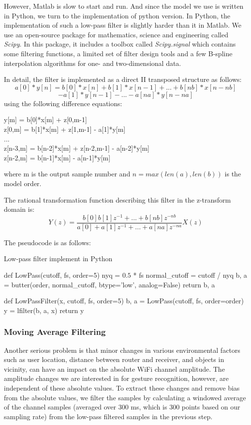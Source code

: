 \documentclass[conference]{IEEEtran}
\begin{document}
However, Matlab is slow to start and run. And since the model we use is written in Python, we turn to the implementation of python version. In Python, the implementation of such a low-pass filter is slightly harder than it in Matlab. We use an open-source package for mathematics, science and engineering called \emph{Scipy}. In this package, it includes a toolbox called \emph{Scipy.signal} which contains some filtering functions, a limited set of filter design tools and a few B-spline interpolation algorithms for one- and two-dimensional data.

In detail, the filter is implemented as a direct II transposed structure as follows:
$$a[0]*y[n] = b[0]*x[n] + b[1]*x[n-1] + ... + b[nb]*x[n-nb]$$
                        $$- a[1]*y[n-1] - ... - a[na]*y[n-na]$$
using the following difference equations:
\begin{algorithm}[H]
y[m] = b[0]*x[m] + z[0,m-1] \\
z[0,m] = b[1]*x[m] + z[1,m-1] - a[1]*y[m]\\
...\\
z[n-3,m] = b[n-2]*x[m] + z[n-2,m-1] - a[n-2]*y[m]\\
z[n-2,m] = b[n-1]*x[m] - a[n-1]*y[m]\\
\end{algorithm}
where m is the output sample number and $n=max(len(a), len(b))$ is the model order.

The rational transformation function describing this filter in the z-transform domain is:
$$Y(z) = \frac{b[0]b[1]z^{-1}+...+b[nb]z^{-nb}}{a[0]+a[1]z^{-1}+...+a[na]z^{-na}}X(z)$$

The pseudocode is as follows:
\begin{algorithm}
\centering
	\caption{Low-pass filter implement in Python}
	\begin{algorithmic}
	\STATE def LowPass(cutoff, fs, order=5) 
	\STATE \qquad nyq = $0.5$ * fs
	\STATE \qquad normal\_cutoff = cutoff / nyq
	\STATE \qquad b, a = butter(order, normal\_cutoff, 
	\STATE \qquad \qquad \qquad \qquad btype='low', analog=False)
	\STATE \qquad return b, a

	\STATE def LowPassFilter(x, cutoff, fs, order=5) 
	\STATE \qquad b, a = LowPass(cutoff, fs, order=order)
	\STATE \qquad y = lfilter(b, a, x)
	\STATE \qquad return y
	\end{algorithmic}
\end{algorithm}

\subsubsection{Moving Average Filtering}
Another serious problem is that minor changes in various environmental factors such as user location, distance between router and receiver, and objects in vicinity, can have an impact on the absolute WiFi channel amplitude. The amplitude changes we are interested in for gesture recognition, however, are independent of these absolute values. To extract these changes and remove bias from the absolute values, we filter the samples by calculating a windowed average of the channel samples (averaged over 300 ms, which is 300 points based on our sampling rate) from the low-pass filtered samples in the previous step.
\end{document}
